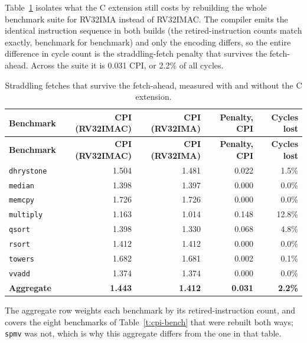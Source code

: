\documentclass[11pt,pdftex,openany,letterpaper]{report}
\begin{document}
Table~\ref{t:cpi-align} isolates what the C extension still costs by rebuilding the whole benchmark suite for RV32IMA instead of RV32IMAC. The compiler emits the identical instruction sequence in both builds (the retired-instruction counts match exactly, benchmark for benchmark) and only the encoding differs, so the entire difference in cycle count is the straddling-fetch penalty that survives the fetch-ahead. Across the suite it is 0.031 CPI, or 2.2\% of all cycles.

\begin{longtable}[c]{ l r r r r }
\caption{Straddling fetches that survive the fetch-ahead, measured with and without the C extension.} \label{t:cpi-align} \\
\hline \textbf{Benchmark} & \textbf{CPI (RV32IMAC)} & \textbf{CPI (RV32IMA)} & \textbf{Penalty, CPI} & \textbf{Cycles lost} \\ \hline \endfirsthead
\hline \textbf{Benchmark} & \textbf{CPI (RV32IMAC)} & \textbf{CPI (RV32IMA)} & \textbf{Penalty, CPI} & \textbf{Cycles lost} \\ \hline \endhead
                               \texttt{dhrystone} & 1.504 & 1.481 & 0.022 & 1.5\% \\
\rowcolor{tablehighlightcolor} \texttt{median}    & 1.398 & 1.397 & 0.000 & 0.0\% \\
                               \texttt{memcpy}    & 1.726 & 1.726 & 0.000 & 0.0\% \\
\rowcolor{tablehighlightcolor} \texttt{multiply}  & 1.163 & 1.014 & 0.148 & 12.8\% \\
                               \texttt{qsort}     & 1.398 & 1.330 & 0.068 & 4.8\% \\
\rowcolor{tablehighlightcolor} \texttt{rsort}     & 1.412 & 1.412 & 0.000 & 0.0\% \\
                               \texttt{towers}    & 1.682 & 1.681 & 0.002 & 0.1\% \\
\rowcolor{tablehighlightcolor} \texttt{vvadd}     & 1.374 & 1.374 & 0.000 & 0.0\% \\
\hline
                               \textbf{Aggregate} & \textbf{1.443} & \textbf{1.412} & \textbf{0.031} & \textbf{2.2\%} \\
\hline
\end{longtable}

The aggregate row weights each benchmark by its retired-instruction count, and covers the eight benchmarks of Table~\ref{t:cpi-bench} that were rebuilt both ways; \texttt{spmv} was not, which is why this aggregate differs from the one in that table.
\end{document}
